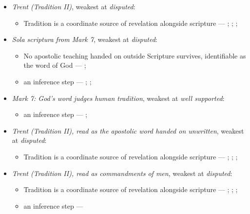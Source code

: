 \documentclass[11pt]{article}
\begin{document}
\begin{itemize}
\item \emph{Trent (Tradition II)}, weakest at \emph{disputed}:
\begin{itemize}
\item Tradition is a coordinate source of revelation alongside scripture --- \cite[Trent, Session IV (1546), Decree on Sacred Books and Traditions]{tanner-decrees-1990}; \cite{mathison-shape-sola-scriptura-2001}; \cite{geiselmann-meaning-of-tradition-1966}; \cite{congar-tradition-and-traditions-1966}
\end{itemize}
\item \emph{Sola scriptura from Mark 7}, weakest at \emph{disputed}:
\begin{itemize}
\item No apostolic teaching handed on outside Scripture survives, identifiable as the word of God --- \cite[506]{whitaker-disputation-1849}; \cite[I.6]{westminster-confession-1647}
\item an inference step --- \cite{geiselmann-meaning-of-tradition-1966}; \cite[Vatican I (1870), Pastor Aeternus, ch. 4]{tanner-decrees-1990}; \cite{florovsky-bible-church-tradition-1972}
\end{itemize}
\item \emph{Mark 7: God's word judges human tradition}, weakest at \emph{well supported}:
\begin{itemize}
\item an inference step --- \cite[Vatican II (1965), Dei Verbum 10]{tanner-decrees-1990}; \cite[IV.x.23]{calvin-institutes-1960}
\end{itemize}
\item \emph{Trent (Tradition II), read as the apostolic word handed on unwritten}, weakest at \emph{disputed}:
\begin{itemize}
\item Tradition is a coordinate source of revelation alongside scripture --- \cite[Trent, Session IV (1546), Decree on Sacred Books and Traditions]{tanner-decrees-1990}; \cite{mathison-shape-sola-scriptura-2001}; \cite{geiselmann-meaning-of-tradition-1966}; \cite{congar-tradition-and-traditions-1966}
\end{itemize}
\item \emph{Trent (Tradition II), read as commandments of men}, weakest at \emph{disputed}:
\begin{itemize}
\item Tradition is a coordinate source of revelation alongside scripture --- \cite[Trent, Session IV (1546), Decree on Sacred Books and Traditions]{tanner-decrees-1990}; \cite{mathison-shape-sola-scriptura-2001}; \cite{geiselmann-meaning-of-tradition-1966}; \cite{congar-tradition-and-traditions-1966}
\item an inference step --- \cite[IV.x.23]{calvin-institutes-1960}
\end{itemize}
\end{itemize}
\end{document}
